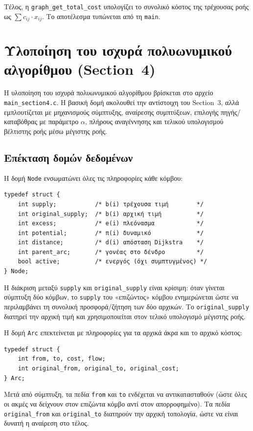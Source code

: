 \documentclass[11pt,a4paper,oneside]{report}
\let\oldsubsection\subsection
\renewcommand{\subsection}{\FloatBarrier\oldsubsection}
\begin{document}
Τέλος, η \texttt{graph\_get\_total\_cost} υπολογίζει το συνολικό κόστος της τρέχουσας ροής ως $\sum c_{ij} \cdot x_{ij}$. Το αποτέλεσμα τυπώνεται από τη \texttt{main}.

\section{Υλοποίηση του ισχυρά πολυωνυμικού αλγορίθμου (\textenglish{Section~4})}

Η υλοποίηση του ισχυρά πολυωνυμικού αλγορίθμου βρίσκεται στο αρχείο
\texttt{main\_section4.c}. Η βασική δομή ακολουθεί την αντίστοιχη του \textenglish{Section~3}, αλλά εμπλουτίζεται με μηχανισμούς σύμπτυξης, αναίρεσης συμπτύξεων, επιλογής πηγής/καταβόθρας με παράμετρο $\alpha$, πλήρους αναγέννησης και τελικού υπολογισμού βέλτιστης ροής μέσω μέγιστης ροής.

\subsection{Επέκταση δομών δεδομένων}

Η δομή \texttt{Node} ενσωματώνει όλες τις πληροφορίες κάθε κόμβου:

\begin{verbatim}
typedef struct {
    int supply;           /* b(i) τρέχουσα τιμή        */
    int original_supply;  /* b(i) αρχική τιμή          */
    int excess;           /* e(i) πλεόνασμα            */
    int potential;        /* π(i) δυναμικό             */
    int distance;         /* d(i) απόσταση Dijkstra    */
    int parent_arc;       /* γονέας στο δένδρο         */
    bool active;          /* ενεργός (όχι συμπτυγμένος) */
} Node;
\end{verbatim}

Η διάκριση μεταξύ \texttt{supply} και \texttt{original\_supply} είναι κρίσιμη: όταν γίνεται σύμπτυξη δύο κόμβων, το \texttt{supply} του «επιζώντος» κόμβου ενημερώνεται ώστε να περιλαμβάνει τη συνολική προσφορά/ζήτηση των δύο αρχικών. Το \texttt{original\_supply} διατηρεί την αρχική τιμή και χρησιμοποιείται στον τελικό υπολογισμό μέγιστης ροής.

Η δομή \texttt{Arc} επεκτείνεται με πληροφορίες για τα αρχικά άκρα και το αρχικό κόστος:

\begin{verbatim}
typedef struct {
    int from, to, cost, flow;
    int original_from, original_to, original_cost;
} Arc;
\end{verbatim}

Μετά από σύμπτυξη, τα πεδία \texttt{from} και \texttt{to} ενδέχεται να αντικατασταθούν (ώστε όλες οι ακμές να δείχνουν στον επιζώντα κόμβο αντί στον απορροφημένο). Τα πεδία \texttt{original\_from} και \texttt{original\_to} διατηρούν την αρχική τοπολογία, ώστε να είναι δυνατή η αναίρεση στο τέλος.
\end{document}

